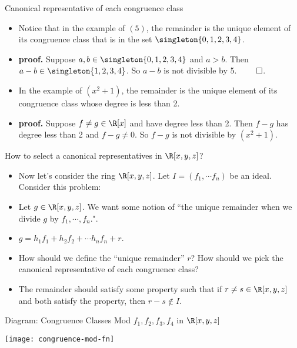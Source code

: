 \documentclass{beamer}
\begin{document}
\begin{frame}{Canonical representative of each congruence class}

\begin{itemize}
  \item Notice that in the example of $(5)$, the remainder is the unique element of its congruence class that is in the set $\singleton{0,1,2,3,4}$.
  \item \textbf{proof.} Suppose $a,b\in \singleton{0,1,2,3,4}$ and $a> b$. Then $a-b\in \singleton{1,2,3,4}$. So $a-b$ is not divisible by 5. $\qed$.
  \item In the example of $(x^2+1)$, the remainder is the unique element of its congruence class whose degree is less than 2.
  \item \textbf{proof.} Suppose $f\not=g\in\R[x]$ and have degree less than 2. Then $f-g$ has degree less than 2 and $f-g\not=0$. So $f-g$ is not divisible
  by $(x^2+1)$.
\end{itemize}

\end{frame}



\begin{frame}{How to select a canonical representatives in $\R[x,y,z]$?}

\begin{itemize}
  \item Now let's consider the ring $\R[x,y,z]$. Let $I=(f_1,\cdots f_n)$ be an ideal. Consider this problem:
  \item Let $g\in\R[x,y,z]$. We want some notion of ``the unique remainder when we divide $g$ by $f_1,\cdots, f_n$.".
  \item $g = h_1 f_1 + h_2 f_2 + \cdots h_n f_n + r$.
  \item How should we define the ``unique remainder'' $r$? How should we pick the canonical representative of each congruence class?
  \item The remainder should satisfy some property such that if $r \not= s \in \R[x,y,z]$ and both satisfy the property, then $r-s\notin I$.
\end{itemize}

\end{frame}


\begin{frame}{Diagram: Congruence Classes Mod $f_1,f_2,f_3,f_4$ in $\R[x,y,z]$}

\begin{center}
\texttt{[image: congruence-mod-fn]}
\end{center}

\end{frame}


\end{document}
